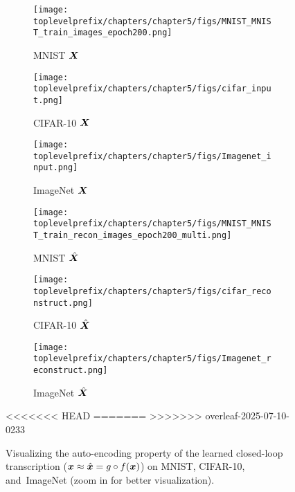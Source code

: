 \documentclass[../../book-main.tex]{subfiles}
\begin{document}
\begin{figure}[t]
    \begin{subfigure}[t]{0.3\textwidth}
        \centering
        \texttt{[image: \\toplevelprefix/chapters/chapter5/figs/MNIST\_MNIST\_train\_images\_epoch200.png]}
        \caption{{\small MNIST $\bm{X}$}}
    \end{subfigure}
    \hfill
    \begin{subfigure}[t]{0.3\textwidth}
        \centering
        \texttt{[image: \\toplevelprefix/chapters/chapter5/figs/cifar\_input.png]}
        \caption{{\small CIFAR-10 $\bm{X}$}}
    \end{subfigure}
    \hfill
    \begin{subfigure}[t]{0.3\textwidth}
        \centering
        \texttt{[image: \\toplevelprefix/chapters/chapter5/figs/Imagenet\_input.png]}
        \caption{{\small ImageNet $\bm{X}$}}
    \end{subfigure}

    \begin{subfigure}[t]{0.3\textwidth}
        \centering
        \texttt{[image: \\toplevelprefix/chapters/chapter5/figs/MNIST\_MNIST\_train\_recon\_images\_epoch200\_multi.png]}
        \caption{{\small MNIST $\hat{\bm{X}}$}}
    \end{subfigure}
    \hfill
    \begin{subfigure}[t]{0.3\textwidth}
        \centering
        \texttt{[image: \\toplevelprefix/chapters/chapter5/figs/cifar\_reconstruct.png]}
        \caption{{\small CIFAR-10 $\hat{\bm{X}}$}}
    \end{subfigure}
    \hfill
    \begin{subfigure}[t]{0.3\textwidth}
        \centering
        \texttt{[image: \\toplevelprefix/chapters/chapter5/figs/Imagenet\_reconstruct.png]}
        \caption{{\small ImageNet $\hat{\bm{X}}$}}
    \end{subfigure}
    \caption{Visualizing the auto-encoding property of the learned closed-loop transcription \mbox{($\bm{x} \approx \hat{\bm{x}} = g\circ f(\bm{x})$)} on MNIST, CIFAR-10, and~ImageNet (zoom in for better visualization).}
<<<<<<< HEAD
    \label{fig:justfy_xhat_equals_x}
=======
    \label{fig:justfy_xhat_equals_x-1}
>>>>>>> overleaf-2025-07-10-0233
\end{figure}
     
\end{document}
